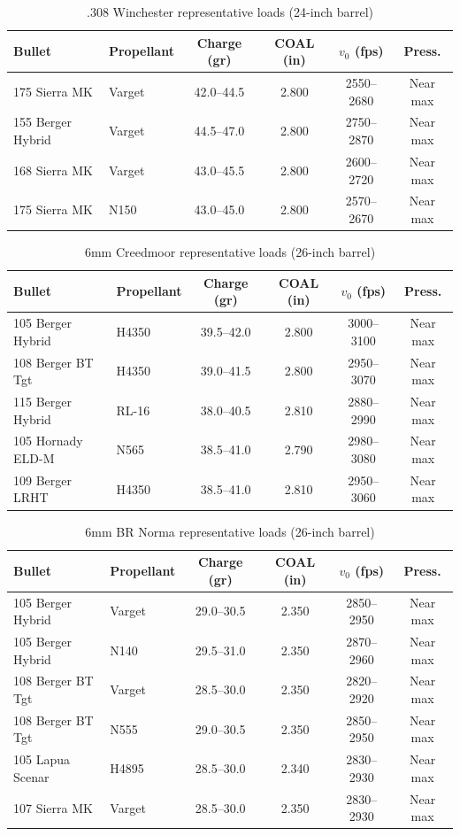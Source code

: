\documentclass[11pt,twoside,openright]{report}
\begin{document}
\begin{table}[H]
\centering
\caption{.308 Winchester representative loads (24-inch barrel)}
\label{tab:308_loads}
\begin{tabular}{@{}llcccc@{}}
\toprule
\textbf{Bullet} & \textbf{Propellant} & \textbf{Charge (gr)} & \textbf{COAL (in)} & \textbf{$v_0$ (fps)} & \textbf{Press.} \\
\midrule
175 Sierra MK & Varget & 42.0--44.5 & 2.800 & 2550--2680 & Near max \\
155 Berger Hybrid & Varget & 44.5--47.0 & 2.800 & 2750--2870 & Near max \\
168 Sierra MK & Varget & 43.0--45.5 & 2.800 & 2600--2720 & Near max \\
175 Sierra MK & N150 & 43.0--45.0 & 2.800 & 2570--2670 & Near max \\
\bottomrule
\end{tabular}
\end{table}

\begin{table}[H]
\centering
\caption{6mm Creedmoor representative loads (26-inch barrel)}
\label{tab:6cm_loads}
\begin{tabular}{@{}llcccc@{}}
\toprule
\textbf{Bullet} & \textbf{Propellant} & \textbf{Charge (gr)} & \textbf{COAL (in)} & \textbf{$v_0$ (fps)} & \textbf{Press.} \\
\midrule
105 Berger Hybrid & H4350 & 39.5--42.0 & 2.800 & 3000--3100 & Near max \\
108 Berger BT Tgt & H4350 & 39.0--41.5 & 2.800 & 2950--3070 & Near max \\
115 Berger Hybrid & RL-16 & 38.0--40.5 & 2.810 & 2880--2990 & Near max \\
105 Hornady ELD-M & N565 & 38.5--41.0 & 2.790 & 2980--3080 & Near max \\
109 Berger LRHT & H4350 & 38.5--41.0 & 2.810 & 2950--3060 & Near max \\
\bottomrule
\end{tabular}
\end{table}

\begin{table}[H]
\centering
\caption{6mm BR Norma representative loads (26-inch barrel)}
\label{tab:6br_loads}
\begin{tabular}{@{}llcccc@{}}
\toprule
\textbf{Bullet} & \textbf{Propellant} & \textbf{Charge (gr)} & \textbf{COAL (in)} & \textbf{$v_0$ (fps)} & \textbf{Press.} \\
\midrule
105 Berger Hybrid & Varget & 29.0--30.5 & 2.350 & 2850--2950 & Near max \\
105 Berger Hybrid & N140 & 29.5--31.0 & 2.350 & 2870--2960 & Near max \\
108 Berger BT Tgt & Varget & 28.5--30.0 & 2.350 & 2820--2920 & Near max \\
108 Berger BT Tgt & N555 & 29.0--30.5 & 2.350 & 2850--2950 & Near max \\
105 Lapua Scenar & H4895 & 28.5--30.0 & 2.340 & 2830--2930 & Near max \\
107 Sierra MK & Varget & 28.5--30.0 & 2.350 & 2830--2930 & Near max \\
\bottomrule
\end{tabular}
\end{table}
\end{document}
